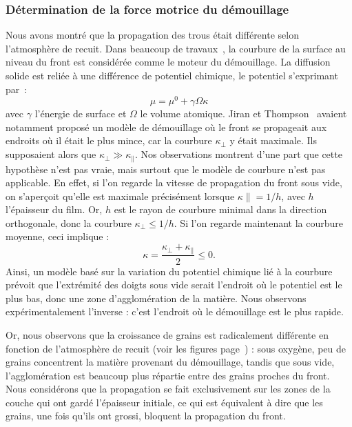 {{			\subsubsection{Détermination de la force motrice du démouillage}
Nous avons montré que la propagation des trous était différente selon l’atmosphère de recuit. Dans beaucoup de travaux~\cite{presland1972hillock, jiran1990capillary, zucker2013model}, la courbure de la surface au niveau du front est considérée comme le moteur du démouillage. La diffusion solide est reliée à une différence de potentiel chimique, le potentiel s’exprimant par~:
\begin{equation}
\mu = \mu^0 +\gamma \Omega \kappa
\end{equation}
avec $\gamma$ l’énergie de surface et $\Omega$ le volume atomique. Jiran et Thompson~\cite{jiran1990capillary} avaient notamment proposé un modèle de démouillage où le front se propageait aux endroits où il était le plus mince, car la courbure $\kappa_\perp$ y était maximale. Ils supposaient alors que $\kappa_\perp \gg \kappa_\parallel$. Nos observations montrent d’une part que cette hypothèse n’est pas vraie, mais surtout que le modèle de courbure n’est pas applicable. En effet, si l’on regarde la vitesse de propagation du front sous vide, on s’aperçoit qu’elle est maximale précisément lorsque $\kappa\parallel = 1/h$, avec $h$ l’épaisseur du film. Or, $h$ est le rayon de courbure minimal dans la direction orthogonale, donc la courbure $\kappa_\perp\leq 1/h$. Si l’on regarde maintenant la courbure moyenne, ceci implique :
\begin{equation}
\kappa = \dfrac{\kappa_\perp+\kappa_\parallel}{2}\leq 0.
\end{equation}
Ainsi, un modèle basé sur la variation du potentiel chimique lié à la courbure prévoit que l’extrémité des doigts sous vide serait l’endroit où le potentiel est le plus bas, donc une zone d’agglomération de la matière. Nous observons expérimentalement l’inverse : c’est l’endroit où le démouillage est le plus rapide.\par 
{}
Or, nous observons que la croissance de grains est radicalement différente en fonction de l’atmosphère de recuit (voir les figures page~\pageref{MEBgrainsOx}) : sous oxygène, peu de grains concentrent la matière provenant du démouillage, tandis que sous vide, l’agglomération est beaucoup plus répartie entre des grains proches du front. Nous considérons que la propagation se fait exclusivement sur les zones de la couche qui ont gardé l’épaisseur initiale, ce qui est équivalent à dire que les grains, une fois qu’ils ont grossi, bloquent la propagation du front.\par 
}}
